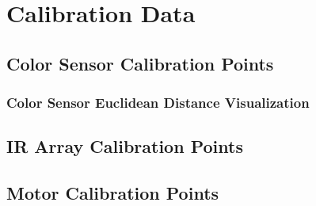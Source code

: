 \documentclass{report}
\begin{document}
\chapter{Calibration Data}

\section{Color Sensor Calibration Points}
\label{sc:color-sensor-points}


\subsection{Color Sensor Euclidean Distance Visualization}
\label{sc:color-sensor-visualization}


\section{IR Array Calibration Points}
\label{sc:ir-array-points}


\section{Motor Calibration Points}
\label{sc:motor-points}

\end{document}
